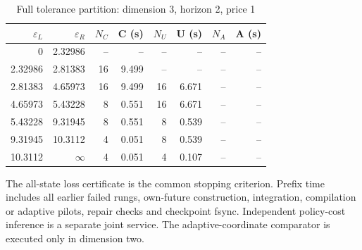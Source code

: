 \begin{table}[htbp]
\centering
\caption{Full tolerance partition: dimension 3, horizon 2, price 1}\label{tab:frontier-full48-3-2-1}
\footnotesize
\begin{tabular}{rrrrrrrr}
\toprule
$\varepsilon_L$ & $\varepsilon_R$ & $N_C$ & C (s) & $N_U$ & U (s) & $N_A$ & A (s)\\
\midrule
0 & 2.32986 & -- & -- & -- & -- & -- & -- \\
2.32986 & 2.81383 & 16 & 9.499 & -- & -- & -- & -- \\
2.81383 & 4.65973 & 16 & 9.499 & 16 & 6.671 & -- & -- \\
4.65973 & 5.43228 & 8 & 0.551 & 16 & 6.671 & -- & -- \\
5.43228 & 9.31945 & 8 & 0.551 & 8 & 0.539 & -- & -- \\
9.31945 & 10.3112 & 4 & 0.051 & 8 & 0.539 & -- & -- \\
10.3112 & $\infty$ & 4 & 0.051 & 4 & 0.107 & -- & -- \\
\bottomrule
\end{tabular}
\begin{minipage}{0.97\linewidth}\footnotesize\vspace{3pt}
The all-state loss certificate is the common stopping criterion. Prefix time includes all earlier failed rungs, own-future construction, integration, compilation or adaptive pilots, repair checks and checkpoint fsync. Independent policy-cost inference is a separate joint service. The adaptive-coordinate comparator is executed only in dimension two.
\end{minipage}
\end{table}
